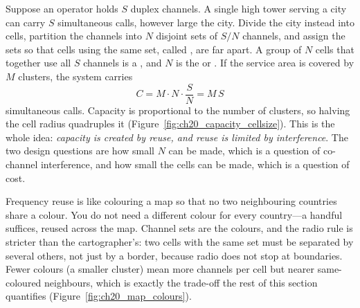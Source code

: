Suppose an operator holds $S$ duplex channels. A single high tower serving a city can carry $S$
simultaneous calls, however large the city. Divide the city instead into cells, partition the channels
into $N$ disjoint sets of $S/N$ channels, and assign the sets so that cells using the same set, called
, are far apart. A group of $N$ cells that together use all $S$ channels is a
, and $N$ is the  or . If the service area is covered
by $M$ clusters, the system carries
\begin{equation}
C=M\cdot N\cdot\frac SN=M\,S
\label{eq:ch20:capacity}
\end{equation}
\noindent simultaneous calls. Capacity is proportional to the number of clusters, so halving the cell radius
quadruples it (Figure~\ref{fig:ch20_capacity_cellsize}). This is the whole idea: \emph{capacity is created
by reuse, and reuse is limited by interference}. The two design questions are how small $N$ can be made,
which is a question of co-channel interference, and how small the cells can be made, which is a question
of cost.

\begin{analogy}
Frequency reuse is like colouring a map so that no two neighbouring countries share a colour. You do not
need a different colour for every country---a handful suffices, reused across the map. Channel sets are
the colours, and the radio rule is stricter than the cartographer's: two cells with the same set must be
separated by several others, not just by a border, because radio does not stop at boundaries. Fewer
colours (a smaller cluster) mean more channels per cell but nearer same-coloured neighbours, which is
exactly the trade-off the rest of this section quantifies (Figure~\ref{fig:ch20_map_colours}).
\end{analogy}


